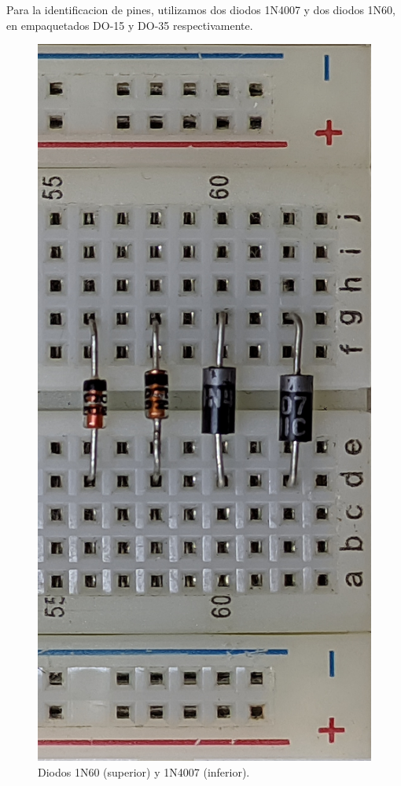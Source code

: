 \documentclass[chaptersright]{informeutn}
\begin{document}
    Para la identificacion de pines, utilizamos dos diodos 1N4007 y dos diodos 1N60, en empaquetados DO-15 y DO-35
    respectivamente.

    \begin{figure}[!ht]
      \centering
      \includegraphics[angle=-90, width=.5\textwidth]{pictures/prot_diod-all.jpg}
      \caption{Diodos 1N60 (superior) y 1N4007 (inferior).}
    \end{figure}
\end{document}
